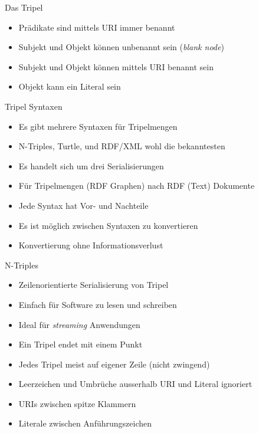 \documentclass{beamer}
\begin{document}
\begin{frame}{Das Tripel}
	
	\begin{itemize}
		\item Prädikate sind mittels URI immer benannt
		\item Subjekt und Objekt können unbenannt sein (\emph{blank node})
		\item Subjekt und Objekt können mittels URI benannt sein
		\item Objekt kann ein Literal sein
	\end{itemize}
	
\end{frame}

\begin{frame}{Tripel Syntaxen}
	
	\begin{itemize}
		\item Es gibt mehrere Syntaxen für Tripelmengen
		\item N-Triples, Turtle, und RDF/XML wohl die bekanntesten
		\item Es handelt sich um drei Serialisierungen 
		\item Für Tripelmengen (RDF Graphen) nach RDF (Text) Dokumente
		\item Jede Syntax hat Vor- und Nachteile
		\item Es ist möglich zwischen Syntaxen zu konvertieren
		\item Konvertierung ohne Informationsverlust
	\end{itemize}
	
\end{frame}

\begin{frame}{N-Triples}
	
	\begin{itemize}
		\item Zeilenorientierte Serialisierung von Tripel
		\item Einfach für Software zu lesen und schreiben
		\item Ideal für \emph{streaming} Anwendungen
		\item Ein Tripel endet mit einem Punkt
		\item Jedes Tripel meist auf eigener Zeile (nicht zwingend)
		\item Leerzeichen und Umbrüche ausserhalb URI und Literal ignoriert
		\item URIs zwischen spitze Klammern 
		\item Literale zwischen Anführungszeichen
	\end{itemize}
	
\end{frame}
\end{document}
